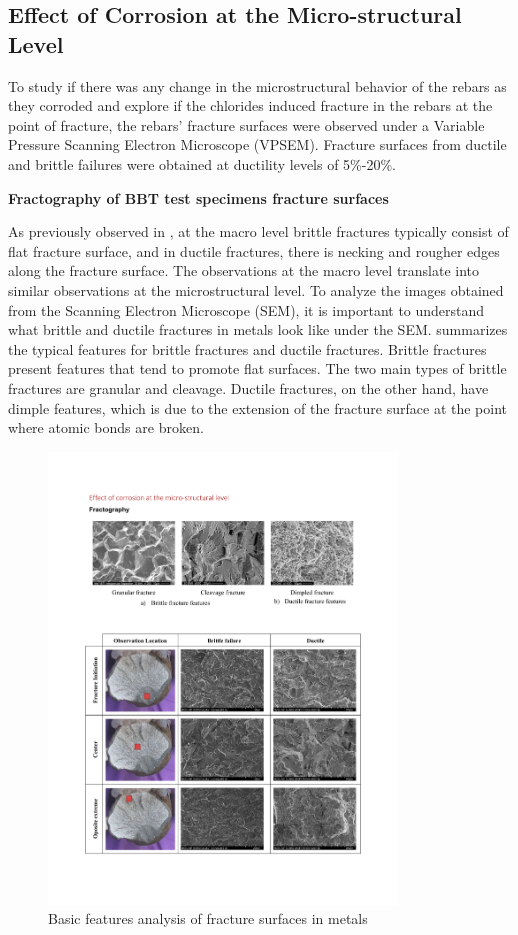 \subsection{Effect of Corrosion at the Micro-structural Level}

To study if there was any change in the microstructural behavior of the rebars as they corroded and explore if the chlorides induced fracture in the rebars at the point of fracture, the rebars' fracture surfaces were observed under a Variable Pressure Scanning Electron Microscope (VPSEM). Fracture surfaces from ductile and brittle failures were obtained at ductility levels of 5\%-20\%.

\textbf{Fractography of BBT test specimens fracture surfaces}

 As previously observed in , at the macro level brittle fractures typically consist of flat fracture surface, and in ductile fractures, there is necking and rougher edges along the fracture surface. The observations at the macro level translate into similar observations at the microstructural level. To analyze the images obtained from the Scanning Electron Microscope (SEM), it is important to understand what brittle and ductile fractures in metals look like under the SEM.  summarizes the typical features for brittle fractures and ductile fractures. Brittle fractures present features that tend to promote flat surfaces. The two main types of brittle fractures are granular and cleavage. Ductile fractures, on the other hand, have dimple features, which is due to the extension of the fracture surface at the point where atomic bonds are broken.
 
\begin{figure}[htbp]
	\centering
	\includegraphics[width=0.825\textwidth]{VAC Thesis 2.0/Chapter-4/figs/FractographyBasics_101.pdf}
	\caption{Basic features analysis of fracture surfaces in metals}
	\label{fig:fractography101}
\end{figure}

